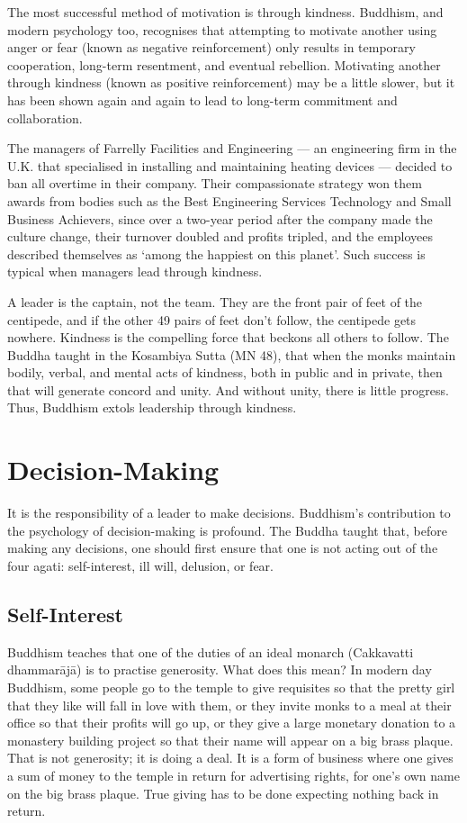 \documentclass[11pt, openany]{book}
\begin{document}
The most successful method of motivation is through kindness. Buddhism, and modern psychology too, recognises that attempting to motivate another using anger or fear (known as negative reinforcement) only results in temporary cooperation, long-term resentment, and eventual rebellion. Motivating another through kindness (known as positive reinforcement) may be a little slower, but it has been shown again and again to lead to long-term commitment and collaboration.

The managers of Farrelly Facilities and Engineering — an engineering firm in the U.K. that specialised in installing and maintaining heating devices — decided to ban all overtime in their company. Their compassionate strategy won them awards from bodies such as the Best Engineering Services Technology and Small Business Achievers, since over a two-year period after the company made the culture change, their turnover doubled and profits tripled, and the employees described themselves as ‘among the happiest on this planet’. Such success is typical when managers lead through kindness.

A leader is the captain, not the team. They are the front pair of feet of the centipede, and if the other 49 pairs of feet don’t follow, the centipede gets nowhere. Kindness is the compelling force that beckons all others to follow. The Buddha taught in the Kosambiya Sutta (MN 48), that when the monks maintain bodily, verbal, and mental acts of kindness, both in public and in private, then that will generate concord and unity. And without unity, there is little progress. Thus, Buddhism extols leadership through kindness.

\chapter{Decision-Making}

It is the responsibility of a leader to make decisions. Buddhism’s contribution to the psychology of decision-making is profound. The Buddha taught that, before making any decisions, one should first ensure that one is not acting out of the four agati: self-interest, ill will, delusion, or fear.

\section{Self-Interest}

Buddhism teaches that one of the duties of an ideal monarch (Cakkavatti dhammarājā) is to practise generosity. What does this mean? In modern day Buddhism, some people go to the temple to give requisites so that the pretty girl that they like will fall in love with them, or they invite monks to a meal at their office so that their profits will go up, or they give a large monetary donation to a monastery building project so that their name will appear on a big brass plaque. That is not generosity; it is doing a deal. It is a form of business where one gives a sum of money to the temple in return for advertising rights, for one’s own name on the big brass plaque. True giving has to be done expecting nothing back in return.
\end{document}

